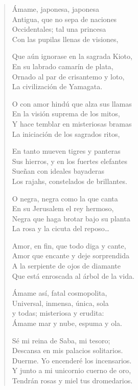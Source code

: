 \documentclass[12pt]{article}
\begin{document}
\begin{verse}
Ámame, japonesa, japonesa\\
Antigua, que no sepa de naciones\\
Occidentales; tal una princesa\\
Con las pupilas llenas de visiones,  

Que aún ignorase en la sagrada Kioto,\\
En su labrado camarín de plata,\\
Ornado al par de crisantemo y loto,\\
La civilización de Yamagata.  

O con amor hindú que alza sus llamas\\
En la visión suprema de los mitos,\\
Y hace temblar en misteriosas bramas\\
La iniciación de los sagrados ritos,  

En tanto mueven tigres y panteras\\
Sus hierros, y en los fuertes elefantes\\
Sueñan con ideales bayaderas\\
Los rajahs, constelados de brillantes.  

O negra, negra como la que canta\\
En su Jerusalem el rey hermoso,\\
Negra que haga brotar bajo su planta\\
La rosa y la cicuta del reposo…  

Amor, en fin, que todo diga y cante,\\
Amor que encante y deje sorprendida\\
A la serpiente de ojos de diamante\\
Que está enroscada al árbol de la vida.  

Ámame así, fatal cosmopolita,\\
Universal, inmensa, única, sola\\
y todas; misteriosa y erudita:\\
Ámame mar y nube, espuma y ola.  

Sé mi reina de Saba, mi tesoro;\\
Descansa en mis palacios solitarios.\\
Duerme. Yo encenderé los incensarios.\\
Y junto a mi unicornio cuerno de oro,\\
Tendrán rosas y miel tus dromedarios.  

\end{verse}
\end{document}
